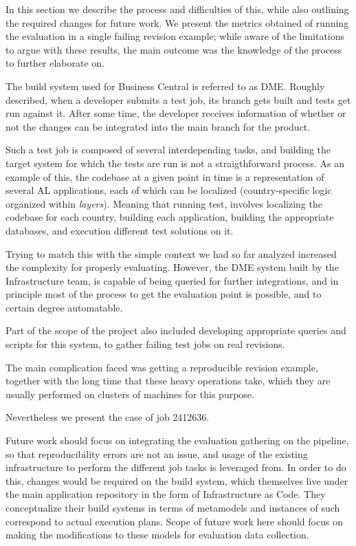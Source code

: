 \documentclass{article}
\begin{document}
In this section we describe the process and difficulties of this, while also outlining the required changes for future work. We present the metrics obtained of running the evaluation in a single failing revision example; while aware of the limitations to argue with these results, the main outcome was the knowledge of the process to further elaborate on.

The build system used for Business Central is referred to as DME. Roughly described, when a developer submits a test job, its branch gets built and tests get run against it. After some time, the developer receives information of whether or not the changes can be integrated into the main branch for the product.

Such a test job is composed of several interdepending tasks, and building the target system for which the tests are run is not a straigthforward process. As an example of this, the codebase at a given point in time is a representation of several AL applications, each of which can be localized (country-specific logic organized within \emph{layers}). Meaning that running test, involves localizing the codebase for each country, building each application, building the appropriate databases, and execution different test solutions on it.

Trying to match this with the simple context we had so far analyzed increased the complexity for properly evaluating. However, the DME system built by the Infrastructure team, is capable of being queried for further integrations, and in principle most of the process to get the evaluation point is possible, and to certain degree automatable.

Part of the scope of the project also included developing appropriate queries and scripts for this system, to gather failing test jobs on real revisions.

The main complication faced was getting a reproducible revision example, together with the long time that these heavy operations take, which they are usually performed on clusters of machines for this purpose.

Nevertheless we present the case of job 2412636.

Future work should focus on integrating the evaluation gathering on the pipeline, so that reproducibility errors are not an issue, and usage of the existing infrastructure to perform the different job tasks is leveraged from. In order to do this, changes would be required on the build system, which themselves live under the main application repository in the form of Infrastructure as Code. They conceptualize their build systems in terms of metamodels and instances of such correspond to actual execution plans. Scope of future work here should focus on making the modifications to these models for evaluation data collection.
\end{document}

